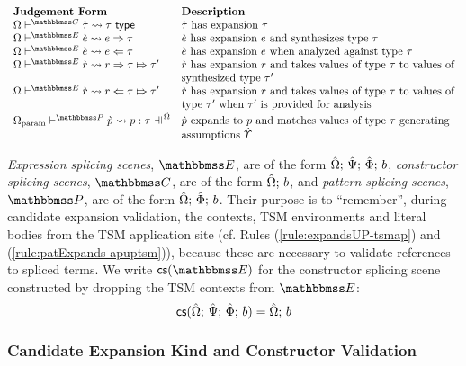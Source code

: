 \vspace{10px}
$\begin{array}{ll}
\textbf{Judgement Form} & \textbf{Description}\\
\cvalidTP{\Omega}{\cscenev}{\ctau}{\tau} & \text{$\ctau$ has expansion $\tau$}\\
\csynPX{\ce}{e}{\tau} & \text{$\ce$ has expansion $e$ and synthesizes type $\tau$}\\
\canaPX{\ce}{e}{\tau} & \text{$\ce$ has expansion $e$ when analyzed against type $\tau$}\\
\crsynPX{\crv}{r}{\tau}{\tau'} & \text{$\crv$ has expansion $r$ and takes values of type $\tau$ to values of}\\
& \text{synthesized type $\tau'$}\\
\cranaPX{\crv}{r}{\tau}{\tau'} & \text{$\crv$ has expansion $r$ and takes values of type $\tau$ to values of}\\
& \text{type $\tau'$ when $\tau'$ is provided for analysis}\\
\cvalidPP{\uOmega}{\pscenev}{\cpv}{p}{\tau} & \text{$\cpv$ expands to $p$ and matches values of type $\tau$ generating}\\
& \text{assumptions $\upctx$}
\end{array}$

\emph{Expression splicing scenes}, $\escenev$, are of the form ${\hat\Omega};\,\hat{\Psi};\,\hat\Phi;\,b$, \emph{constructor splicing scenes}, $\cscenev$, are of the form ${\hat\Omega};\,b$, and \emph{pattern splicing scenes}, $\pscenev$, are of the form ${\hat\Omega};\,\hat\Phi;\,b$. Their purpose is to ``remember'', during candidate expansion validation, the contexts, TSM environments and literal bodies from the TSM application site (cf. Rules (\ref{rule:expandsUP-tsmap}) and (\ref{rule:patExpands-apuptsm})), because these are necessary to validate references to spliced terms. We write $\csfrom{\escenev}$ for the constructor splicing scene constructed by dropping the TSM contexts from $\escenev$:
\[\mathsf{cs}({\hat\Omega};\,\hat{\Psi};\,\hat\Phi;\,b) = {\hat\Omega};\,b\]

\subsubsection{Candidate Expansion Kind and Constructor Validation}

